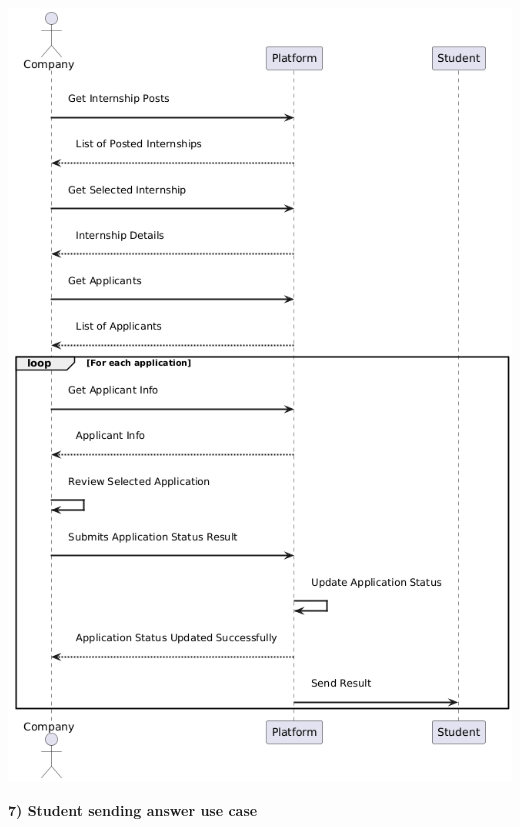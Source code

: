 \begin{center}
    \includegraphics[scale = 0.7]{Images/ImagesRASD/Company_to_manage_income_applications.png}
\end{center}

\newpage
\textbf{7) Student sending answer use case}\\

